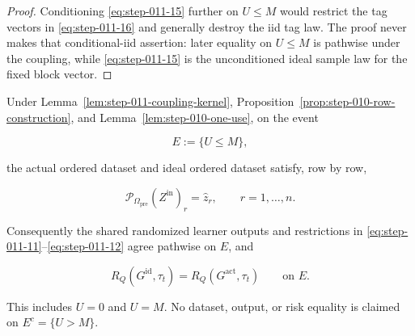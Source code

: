 \begin{proof}
Conditioning \eqref{eq:step-011-15} further on \(U\le M\) would restrict the tag vectors in
\eqref{eq:step-011-16} and generally destroy the iid tag law. The proof never makes that
conditional-iid assertion: later equality on \(U\le M\) is pathwise under
the coupling, while \eqref{eq:step-011-15} is the unconditioned ideal sample law for the fixed
block vector. \end{proof}

\begin{proposition}\label{prop:step-011-no-overflow-identity}
Under Lemma~\ref{lem:step-011-coupling-kernel}, Proposition~\ref{prop:step-010-row-construction}, and Lemma~\ref{lem:step-010-one-use}, on the event

\[
  E:=\{U\le M\},
\tag{S11.19}\label{eq:step-011-19}
\]

the actual ordered dataset and ideal ordered dataset satisfy, row by row,

\[
  \mathcal P_{\Omega_{\mathrm{pre}}}(Z^{\mathrm{in}})_r
  =\widehat z_r,
  \qquad r=1,\ldots,n.
\tag{S11.20}\label{eq:step-011-20}
\]

Consequently the shared randomized learner outputs and restrictions in
\eqref{eq:step-011-11}--\eqref{eq:step-011-12} agree pathwise on \(E\), and

\[
  R_Q(G^{\mathrm{id}},\tau_t)
  =R_Q(G^{\mathrm{act}},\tau_t)
  \qquad\text{on }E.
\tag{S11.21}\label{eq:step-011-21}
\]

This includes \(U=0\) and \(U=M\). No dataset, output, or risk equality is
claimed on \(E^c=\{U>M\}\).
\end{proposition}


